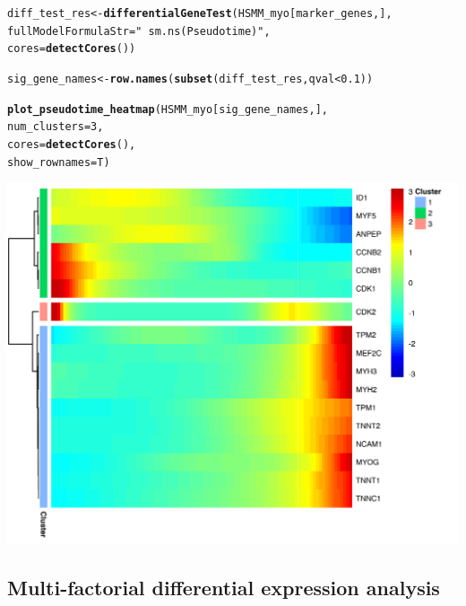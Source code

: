 \documentclass[10pt,oneside]{article}\usepackage[]{graphicx}\usepackage[]{color}
\makeatletter
\def\maxwidth{ %
  \ifdim\Gin@nat@width>\linewidth
    \linewidth
  \else
    \Gin@nat@width
  \fi
}
\newcommand{\hlnum}[1]{\textcolor[rgb]{0.686,0.059,0.569}{#1}}%
\newcommand{\hlstr}[1]{\textcolor[rgb]{0.192,0.494,0.8}{#1}}%
\newcommand{\hlopt}[1]{\textcolor[rgb]{0,0,0}{#1}}%
\newcommand{\hlstd}[1]{\textcolor[rgb]{0.345,0.345,0.345}{#1}}%
\newcommand{\hlkwb}[1]{\textcolor[rgb]{0.69,0.353,0.396}{#1}}%
\newcommand{\hlkwc}[1]{\textcolor[rgb]{0.333,0.667,0.333}{#1}}%
\newcommand{\hlkwd}[1]{\textcolor[rgb]{0.737,0.353,0.396}{\textbf{#1}}}%
\newenvironment{kframe}{%
 \def\at@end@of@kframe{}%
 \ifinner\ifhmode%
  \def\at@end@of@kframe{\end{minipage}}%
  \begin{minipage}{\columnwidth}%
 \fi\fi%
 \def\FrameCommand##1{\hskip\@totalleftmargin \hskip-\fboxsep
 \colorbox{shadecolor}{##1}\hskip-\fboxsep
     \hskip-\linewidth \hskip-\@totalleftmargin \hskip\columnwidth}%
 \MakeFramed {\advance\hsize-\width
   \@totalleftmargin\z@ \linewidth\hsize
   \@setminipage}}%
 {\par\unskip\endMakeFramed%
 \at@end@of@kframe}
\newenvironment{knitrout}{}{} %
\makeatother
\begin{document}
\begin{knitrout}
\color{fgcolor}\begin{kframe}
\begin{alltt}
\hlstd{diff_test_res} \hlkwb{<-} \hlkwd{differentialGeneTest}\hlstd{(HSMM_myo[marker_genes,],}
                                      \hlkwc{fullModelFormulaStr}\hlstd{=}\hlstr{"~sm.ns(Pseudotime)"}\hlstd{,}
                                      \hlkwc{cores} \hlstd{=} \hlkwd{detectCores}\hlstd{())}

\hlstd{sig_gene_names} \hlkwb{<-} \hlkwd{row.names}\hlstd{(}\hlkwd{subset}\hlstd{(diff_test_res, qval} \hlopt{<} \hlnum{0.1}\hlstd{))}


\hlkwd{plot_pseudotime_heatmap}\hlstd{(HSMM_myo[sig_gene_names,],}
                        \hlkwc{num_clusters} \hlstd{=} \hlnum{3}\hlstd{,}
                        \hlkwc{cores} \hlstd{=} \hlkwd{detectCores}\hlstd{(),}
                        \hlkwc{show_rownames} \hlstd{= T)}
\end{alltt}
\end{kframe}

{\centering \includegraphics[width=\maxwidth]{figure/plot_diff_res_pt_heatmap-1} 

}



\end{knitrout}

\subsection{Multi-factorial differential expression analysis}
\end{document}
